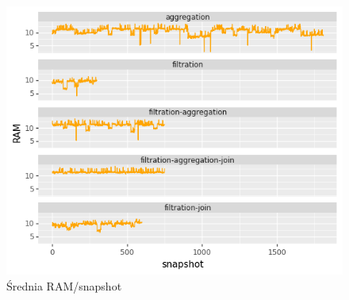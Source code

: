 \begin{figure}[H]
    \centering
    \captionsetup{justification=centering,margin=0.5cm}
    \includegraphics[scale=1.0]{figures/04-opis-danych/data-analysis/all_mean_ram.png}
    \caption{Średnia RAM/snapshot}
    \label{fig:scr46}
\end{figure}

